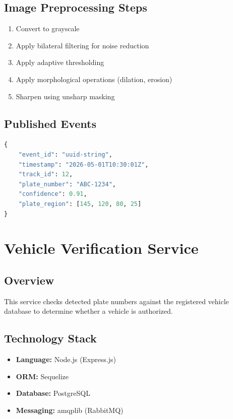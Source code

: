 \documentclass[12pt,a4paper]{report}
\begin{document}
\subsection{Image Preprocessing Steps}
\begin{enumerate}
    \item Convert to grayscale
    \item Apply bilateral filtering for noise reduction
    \item Apply adaptive thresholding
    \item Apply morphological operations (dilation, erosion)
    \item Sharpen using unsharp masking
\end{enumerate}

\subsection{Published Events}
\begin{lstlisting}[language=Python, caption=plate.detected.v1 Event Schema]
{
    "event_id": "uuid-string",
    "timestamp": "2026-05-01T10:30:01Z",
    "track_id": 12,
    "plate_number": "ABC-1234",
    "confidence": 0.91,
    "plate_region": [145, 120, 80, 25]
}
\end{lstlisting}


\section{Vehicle Verification Service}

\subsection{Overview}
This service checks detected plate numbers against the registered vehicle database to determine whether a vehicle is authorized.

\subsection{Technology Stack}
\begin{itemize}
    \item \textbf{Language:} Node.js (Express.js)
    \item \textbf{ORM:} Sequelize
    \item \textbf{Database:} PostgreSQL
    \item \textbf{Messaging:} amqplib (RabbitMQ)
\end{itemize}
\end{document}
